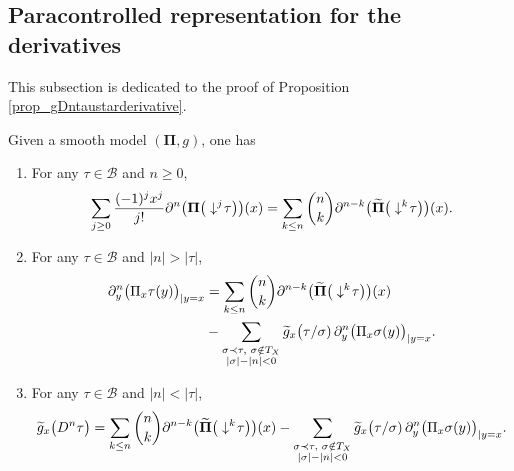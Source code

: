 \documentclass[11pt]{preprint}
\newcommand{\mcB}{\mathcal{B}}
\def\PPi{\boldsymbol{\Pi}}
\begin{document}
	\subsection{Paracontrolled representation for the derivatives \ }
	This subsection is dedicated to the proof of Proposition \ref{prop_gDntaustarderivative}.
	\begin{lemma}\label{lem_derivModifModel}
		Given a smooth model ${ (\PPi,g)}$, one has
		\begin{enumerate}
			\item
			For any $\tau\in\mcB$ and $n\geq0$,
			\begin{equation}\label{eq_partialnkpitilde}
				\sum_{j\geq 0} \frac{(-1)^jx^j}{j!}  \partial^n  \big({\PPi}\big(\downarrow^j\hspace{-2pt}\tau\big)\big)(x) =  \sum_{k\leq n}\binom{n}{k} \partial^{n-k} \big( \widetilde{ \PPi}\big(\downarrow^k\hspace{-2pt}\tau\big)\big)(x).
			\end{equation}
			\item \label{item_DnPixTau_general} For any $\tau\in\mcB$ and $|n|>|\tau|$, 
			\begin{equation} \label{eq_DnPixTau_general}
				\begin{aligned}
				\partial^n_y\big(  { \Pi}_x\tau(y)   \big)_{|y=x} 
				& = 
				\sum_{k\leq n}\binom{n}{k} \partial^{n-k} \big( \widetilde{ \PPi}\big(\downarrow^k\hspace{-2pt}\tau\big)\big)(x)
				\, \\ & - 
				\sum_{\substack{\sigma\prec\tau, \,\, \sigma\notin T_X \\  |\sigma|-|n|<0}} \widetilde{ g}_x\big(\tau/\sigma) \, \partial^n_{y} \big({\Pi}_x\sigma(y)\big)_{|y=x}.
				\end{aligned}
			\end{equation}
			
			\item \label{item_gDnTau_general} For any $\tau\in\mcB$ and $|n|<|\tau|$, 
			\begin{equation}\label{eq_gDnTau_general}
				\widetilde{ g}_x\big( D^n\tau \big)	= 
				\sum_{k\leq n} \binom{n}{k}\partial^{n-k} \big( \widetilde{ \PPi}\big(\downarrow^k\hspace{-2pt}\tau\big)\big)(x)
				- 
				\sum_{\substack{\sigma\prec\tau, \,\, \sigma\notin T_X \\  |\sigma|-|n|<0}} \widetilde{ g}_x\big(\tau/\sigma) \, \partial^n_{y} \big({\Pi}_x\sigma(y)\big)_{|y=x}.
			\end{equation}
		\end{enumerate}
	\end{lemma}
	
\end{document}

